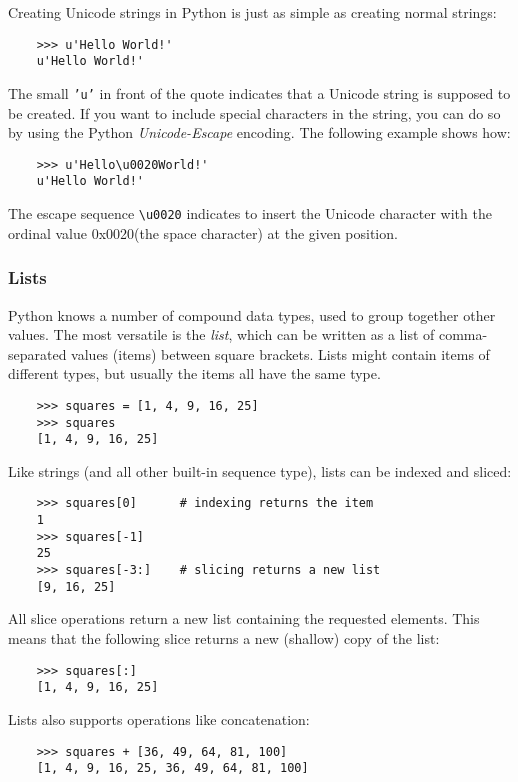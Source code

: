\documentclass[UTF8]{article}
\begin{document}
Creating Unicode strings in Python is just as simple as creating normal strings:
\begin{verbatim}
    >>> u'Hello World!'
    u'Hello World!'
\end{verbatim}

The small \texttt{'u'} in front of the quote indicates that a Unicode string is supposed to be
created. If you want to include special characters in the string, you can do so by using the
Python \emph{Unicode-Escape} encoding. The following example shows how:
\begin{verbatim}
    >>> u'Hello\u0020World!'
    u'Hello World!'
\end{verbatim}
The escape sequence \texttt{\textbackslash u0020} indicates to insert the Unicode character with
the ordinal value 0x0020(the space character) at the given position.

\subsubsection{Lists}
Python knows a number of compound data types, used to group together other values. The most
versatile is the \emph{list}, which can be written as a list of comma-separated values (items)
between square brackets. Lists might contain items of different types, but usually the items all
have the same type.

\begin{verbatim}
    >>> squares = [1, 4, 9, 16, 25]
    >>> squares
    [1, 4, 9, 16, 25]
\end{verbatim}

Like strings (and all other built-in sequence type), lists can be indexed and sliced:
\begin{verbatim}
    >>> squares[0]      # indexing returns the item
    1
    >>> squares[-1]
    25
    >>> squares[-3:]    # slicing returns a new list
    [9, 16, 25]
\end{verbatim}

All slice operations return a new list containing the requested elements. This means that the
following slice returns a new (shallow) copy of the list:
\begin{verbatim}
    >>> squares[:]
    [1, 4, 9, 16, 25]
\end{verbatim}

Lists also supports operations like concatenation:
\begin{verbatim}
    >>> squares + [36, 49, 64, 81, 100]
    [1, 4, 9, 16, 25, 36, 49, 64, 81, 100]
\end{verbatim}
\end{document}
